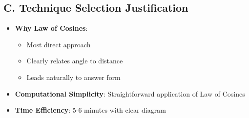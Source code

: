 \documentclass[12pt]{article}
\begin{document}
\begin{techniquesbox}
\subsection*{C. Technique Selection Justification}
\begin{itemize}[leftmargin=*]
    \item \textbf{Why Law of Cosines}: 
    \begin{itemize}
        \item Most direct approach
        \item Clearly relates angle to distance
        \item Leads naturally to answer form
    \end{itemize}
    \item \textbf{Computational Simplicity}: Straightforward application of Law of Cosines
    \item \textbf{Time Efficiency}: 5-6 minutes with clear diagram
\end{itemize}
\end{techniquesbox}
\end{document}

